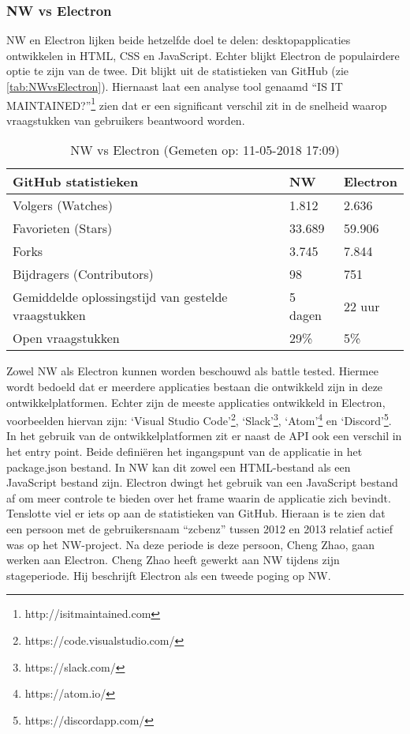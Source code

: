 \pagebreak
\subsubsection{NW vs Electron}
NW en Electron lijken beide hetzelfde doel te delen: desktopapplicaties ontwikkelen in HTML, CSS en JavaScript. Echter blijkt Electron de populairdere optie te zijn van de twee. Dit blijkt uit de statistieken van GitHub (zie \autoref{tab:NWvsElectron}). Hiernaast laat een analyse tool genaamd “IS IT MAINTAINED?”\footnote{http://isitmaintained.com} zien dat er een significant verschil zit in de snelheid waarop vraagstukken van gebruikers beantwoord worden.

\begin{table}[htb]
    \centering
    \begin{tabular}{ | l | l | l | }
        \hline
        GitHub statistieken & \textbf{NW} & \textbf{Electron} \\
        \hline
        Volgers (Watches) & 1.812 & \cellcolor{green!15}2.636 \\
        \hline
        Favorieten (Stars) & 33.689 & \cellcolor{green!15}59.906 \\
        \hline
        Forks & 3.745 & \cellcolor{green!15}7.844 \\
        \hline
        Bijdragers (Contributors) & 98 & \cellcolor{green!15}751 \\
        \hline
        Gemiddelde oplossingstijd van gestelde vraagstukken & \cellcolor{orange!25}5 dagen & \cellcolor{green!15}22 uur \\
        \hline
        Open vraagstukken & \cellcolor{red!25}29\% & \cellcolor{green!15}5\% \\ 
        \hline
    \end{tabular}
    \caption{NW vs Electron (Gemeten op: 11-05-2018 17:09)}    
    \label{tab:NWvsElectron}
\end{table}

Zowel NW als Electron kunnen worden beschouwd als battle tested\cite{NWJSApps}\cite{ElectronApps}. Hiermee wordt bedoeld dat er meerdere applicaties bestaan die ontwikkeld zijn in deze ontwikkelplatformen. Echter zijn de meeste applicaties ontwikkeld in Electron, voorbeelden hiervan zijn: ‘Visual Studio Code’\footnote{https://code.visualstudio.com/}, ‘Slack’\footnote{https://slack.com/}, ‘Atom’\footnote{https://atom.io/} en ‘Discord’\footnote{https://discordapp.com/}.
In het gebruik van de ontwikkelplatformen zit er naast de API ook een verschil in het entry point. Beide definiëren het ingangspunt van de applicatie in het package.json bestand. In NW kan dit zowel een HTML-bestand als een JavaScript bestand zijn. Electron dwingt het gebruik van een JavaScript bestand af om meer controle te bieden over het frame waarin de applicatie zich bevindt.
Tenslotte viel er iets op aan de statistieken van GitHub. Hieraan is te zien dat een persoon met de gebruikersnaam “zcbenz” tussen 2012 en 2013 relatief actief was op het NW-project. Na deze periode is deze persoon, Cheng Zhao, gaan werken aan Electron. Cheng Zhao heeft gewerkt aan NW tijdens zijn stageperiode. Hij beschrijft Electron als een tweede poging op NW\cite{FromNWToElectronZhaoCheng}. 

